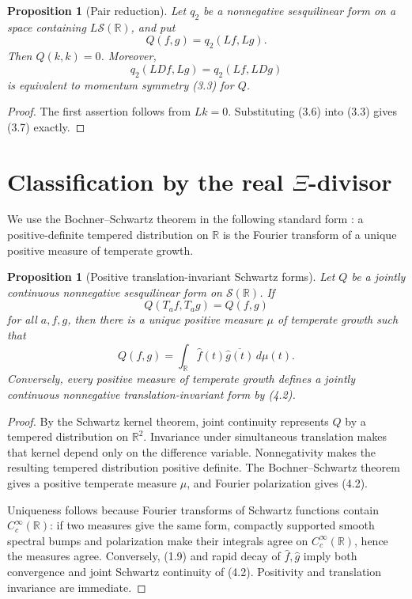 \documentclass[11pt]{article}
\newtheorem{proposition}[theorem]{Proposition}
\newcommand{\R}{\mathbb R}
\newcommand{\cS}{\mathcal S}
\begin{document}
\begin{proposition}[Pair reduction]\label{prop:pair-reduction}
Let \(q_2\) be a nonnegative sesquilinear form on a space containing \(L\cS(\R)\), and put
\[
 Q(f,g)=q_2(Lf,Lg).
\tag{3.6}
\]
Then \(Q(k,k)=0\).  Moreover,
\[
 q_2(LDf,Lg)=q_2(Lf,LDg)
\tag{3.7}
\]
is equivalent to momentum symmetry (3.3) for \(Q\).
\end{proposition}

\begin{proof}
The first assertion follows from \(Lk=0\).  Substituting (3.6) into (3.3) gives (3.7) exactly.
\end{proof}

\section{Classification by the real \(\Xi\)-divisor}\label{sec:classification}

We use the Bochner--Schwartz theorem in the following standard form
\cite[Chap.~VII, \S9]{Schwartz1966}: a positive-definite tempered distribution on \(\R\) is the
Fourier transform of a unique positive measure of temperate growth.

\begin{proposition}[Positive translation-invariant Schwartz forms]\label{prop:BS}
Let \(Q\) be a jointly continuous nonnegative sesquilinear form on \(\cS(\R)\).  If
\[
 Q(T_a f,T_a g)=Q(f,g)
\tag{4.1}
\]
for all \(a,f,g\), then there is a unique positive measure \(\mu\) of temperate growth such that
\[
 Q(f,g)=\int_{\R}\widehat f(t)\overline{\widehat g(t)}\,d\mu(t).
\tag{4.2}
\]
Conversely, every positive measure of temperate growth defines a jointly continuous
nonnegative translation-invariant form by (4.2).
\end{proposition}

\begin{proof}
By the Schwartz kernel theorem, joint continuity represents \(Q\) by a tempered distribution
on \(\R^2\).  Invariance under simultaneous translation makes that kernel depend only on the
difference variable.  Nonnegativity makes the resulting tempered distribution positive
definite.  The Bochner--Schwartz theorem gives a positive temperate measure \(\mu\), and Fourier
polarization gives (4.2).

Uniqueness follows because Fourier transforms of Schwartz functions contain
\(C_c^\infty(\R)\): if two measures give the same form, compactly supported smooth spectral
bumps and polarization make their integrals agree on \(C_c^\infty(\R)\), hence the measures
agree.  Conversely, (1.9) and rapid decay of \(\widehat f,\widehat g\) imply both convergence
and joint Schwartz continuity of (4.2).  Positivity and translation invariance are immediate.
\end{proof}
\end{document}
